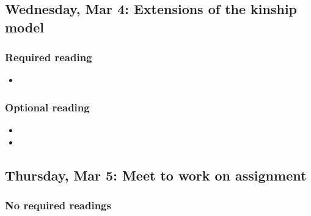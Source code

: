 ﻿\documentclass{article}
\begin{document}
\subsection*{Wednesday, Mar 4: Extensions of the kinship model}

\subsubsection*{Required reading}

\begin{itemize}
   \item {}
\end{itemize}

\subsubsection*{Optional reading}

\begin{itemize}
     \item {}
     \item {}
\end{itemize}

\subsection*{Thursday, Mar 5: Meet to work on assignment}

\subsubsection*{No required readings}
\end{document}
